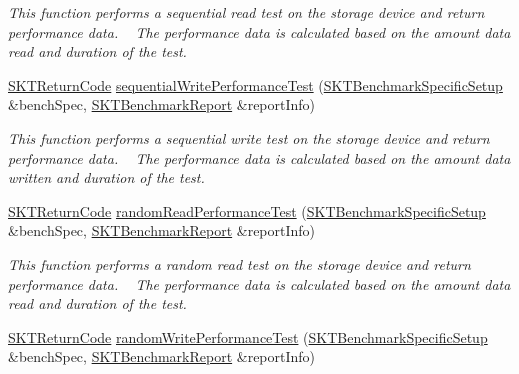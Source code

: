 \begin{DoxyCompactItemize}
\begin{DoxyCompactList}\small\item\em This function performs a sequential read test on the storage device and return performance data. ~\newline
The performance data is calculated based on the amount data read and duration of the test. \end{DoxyCompactList}\item 
\mbox{\hyperlink{_storage_kit_test_delegate_8h_a143844aea21c1ac420c1d0307a69deb7}{S\+K\+T\+Return\+Code}} \mbox{\hyperlink{class_s_k_t_test_delegate_a223a0b6bfc90fe5ccdd43e8e966daeb0}{sequential\+Write\+Performance\+Test}} (\mbox{\hyperlink{struct_s_k_t_benchmark_specific_setup}{S\+K\+T\+Benchmark\+Specific\+Setup}} \&bench\+Spec, \mbox{\hyperlink{struct_s_k_t_benchmark_report}{S\+K\+T\+Benchmark\+Report}} \&report\+Info)
\begin{DoxyCompactList}\small\item\em This function performs a sequential write test on the storage device and return performance data. ~\newline
The performance data is calculated based on the amount data written and duration of the test. \end{DoxyCompactList}\item 
\mbox{\hyperlink{_storage_kit_test_delegate_8h_a143844aea21c1ac420c1d0307a69deb7}{S\+K\+T\+Return\+Code}} \mbox{\hyperlink{class_s_k_t_test_delegate_a9b3d1518a010dbb1c0d28d5360a6fa9f}{random\+Read\+Performance\+Test}} (\mbox{\hyperlink{struct_s_k_t_benchmark_specific_setup}{S\+K\+T\+Benchmark\+Specific\+Setup}} \&bench\+Spec, \mbox{\hyperlink{struct_s_k_t_benchmark_report}{S\+K\+T\+Benchmark\+Report}} \&report\+Info)
\begin{DoxyCompactList}\small\item\em This function performs a random read test on the storage device and return performance data. ~\newline
The performance data is calculated based on the amount data read and duration of the test. \end{DoxyCompactList}\item 
\mbox{\hyperlink{_storage_kit_test_delegate_8h_a143844aea21c1ac420c1d0307a69deb7}{S\+K\+T\+Return\+Code}} \mbox{\hyperlink{class_s_k_t_test_delegate_abbe57641b0fab7b4088419a7c11f8978}{random\+Write\+Performance\+Test}} (\mbox{\hyperlink{struct_s_k_t_benchmark_specific_setup}{S\+K\+T\+Benchmark\+Specific\+Setup}} \&bench\+Spec, \mbox{\hyperlink{struct_s_k_t_benchmark_report}{S\+K\+T\+Benchmark\+Report}} \&report\+Info)

\end{DoxyCompactItemize}

